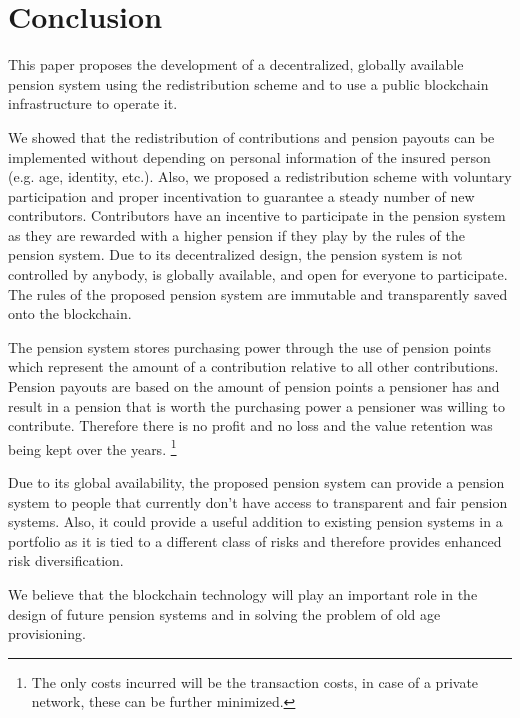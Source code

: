\section{Conclusion}

This paper proposes the development of a decentralized, globally available pension system using the redistribution scheme and to use a public blockchain infrastructure to 
operate it.

We showed that the redistribution of contributions and pension payouts can be implemented without depending on personal information of the insured person (e.g. age, identity, etc.). 
Also, we proposed a redistribution scheme with voluntary participation and proper incentivation to guarantee a steady number of new contributors. Contributors have an incentive to participate in the pension system as they are rewarded with a higher pension if they play by the rules of the pension system. 
Due to its decentralized design, the pension system is not controlled by anybody, is globally available, and open for everyone to participate. The rules of the proposed pension system are immutable and transparently saved onto the blockchain. 

The pension system stores purchasing power through the use of pension points which represent the amount of a contribution relative to all other contributions. Pension payouts are based on the amount of pension points a pensioner has and result in a pension that is worth the purchasing power a pensioner was willing to contribute. Therefore there is no profit and no loss and the value retention was being kept over the  years. \footnote{ The only costs incurred will be the transaction costs, in case of a private network, these can be further minimized.}
 
Due to its global availability, the proposed pension system can provide a pension system to people that currently don't have access to transparent and fair pension systems. Also, it could provide a useful addition to existing pension systems in a portfolio as it is tied to a different class of risks and therefore provides enhanced risk diversification.

We believe that the blockchain technology will play an important role in the design of future pension systems and in solving the problem of old age provisioning.